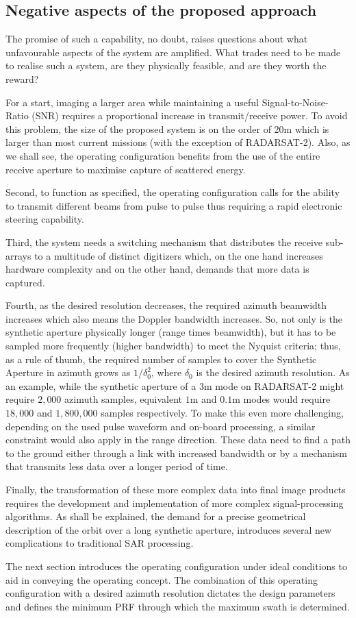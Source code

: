 \subsection{Negative aspects of the proposed approach}
The promise of such a capability, no doubt, raises questions about what unfavourable aspects of the system are amplified. What trades need to be made to realise such a system, are they physically feasible, and are they worth the reward? 
\par
For a start, imaging a larger area while maintaining a useful Signal-to-Noise-Ratio (SNR) requires a proportional increase in transmit/receive power. To avoid this problem, the size of the proposed system is on the order of 20m which is larger than most current missions (with the exception of RADARSAT-2). Also, as we shall see, the operating configuration benefits from the use of the entire receive aperture to maximise capture of scattered energy. 
\par
Second, to function as specified, the operating configuration calls for the ability to transmit different beams from pulse to pulse thus requiring a rapid electronic steering capability. 
\par
Third, the system needs a switching mechanism that distributes the receive sub-arrays to a multitude of distinct digitizers which, on the one hand increases hardware complexity and on the other hand, demands that more data is captured. 
\par
Fourth, as the desired resolution decreases, the required azimuth beamwidth increases which also means the Doppler bandwidth increases. So, not only is the synthetic aperture physically longer (range times beamwidth), but it has to be sampled more frequently (higher bandwidth) to meet the Nyquist criteria; thus, as a rule of thumb, the required number of samples to cover the Synthetic Aperture in azimuth grows as $1/\delta_0^2$, where $\delta_0$ is the desired azimuth resolution. As an example, while the synthetic aperture of a $3\text{m}$ mode on RADARSAT-2 might require $2,000$ azimuth samples, equivalent $1\text{m}$ and $0.1\text{m}$ modes would require $18,000$ and $1,800,000$ samples respectively. To make this even more challenging, depending on the used pulse waveform and on-board processing, a similar constraint would also apply in the range direction. These data need to find a path to the ground either through a link with increased bandwidth or by a mechanism that transmits less data over a longer period of time. 
\par
Finally, the transformation of these more complex data into final image products requires the development and implementation of more complex signal-processing algorithms. As shall be explained, the demand for a precise geometrical description of the orbit over a long synthetic aperture, introduces several new complications to traditional SAR processing.
\par
The next section introduces the operating configuration under ideal conditions to aid in conveying the operating concept. The combination of this operating configuration with a desired azimuth resolution dictates the design parameters and defines the minimum PRF through which the maximum swath is determined.
